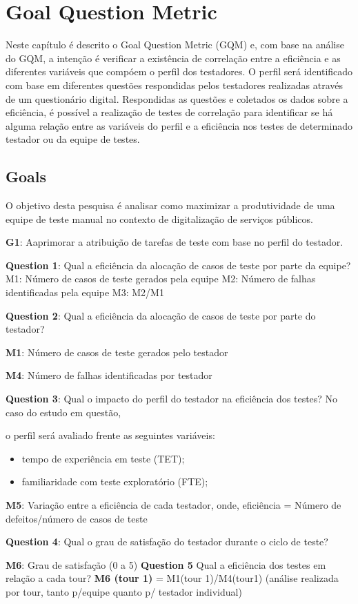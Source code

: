 \chapter[gqm]{Goal Question Metric}

Neste capítulo é descrito o Goal Question Metric (GQM) e, com base na análise do GQM, a intenção é verificar a 
existência de correlação entre a eficiência e as diferentes variáveis que compóem o perfil dos testadores. 
O perfil será identificado com base em diferentes questões respondidas pelos testadores realizadas através de um
questionário digital. Respondidas as questões e coletados os dados sobre a eficiência, é possível a realização 
de testes de correlação para identificar se há alguma relação entre as variáveis do perfil e a eficiência nos 
testes de determinado testador ou da equipe de testes. 

\section{Goals}

O objetivo desta pesquisa é analisar como maximizar a produtividade de uma equipe de teste manual no contexto de
digitalização de serviços públicos. 

\textbf{G1}: Aaprimorar a atribuição de tarefas de teste com base no perfil do testador.

\textbf{Question 1}: Qual a eficiência da alocação de casos de teste por parte da equipe?
M1: Número de casos de teste gerados pela equipe
M2: Número de falhas identificadas pela equipe
M3: M2/M1

\textbf{Question 2}: Qual a eficiência da alocação de casos de teste por parte do testador?

\textbf{M1}: Número de casos de teste gerados pelo testador

\textbf{M4}: Número de falhas identificadas por testador

\textbf{Question 3}: Qual o impacto do perfil do testador na eficiência dos testes? No caso do estudo em questão, 

o perfil será avaliado frente as seguintes variáveis: 

\begin{itemize}
    \item tempo de experiência em teste (TET); 
    \item familiaridade com teste exploratório (FTE);
\end{itemize}

\textbf{M5}: Variação entre a eficiência de cada testador, onde, eficiência = Número de defeitos/número de casos de teste 

\textbf{Question 4}: Qual o grau de satisfação do testador durante o ciclo de teste? 

\textbf{M6}: Grau de satisfação (0 a 5) 
\textbf{Question 5} Qual a eficiência dos testes em relação a cada tour?
\textbf{M6 (tour 1)} = M1(tour 1)/M4(tour1) (análise realizada por tour, tanto p/equipe quanto p/ testador individual) 

